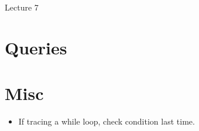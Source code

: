 \documentclass[12pt]{article}
\begin{document}
\begin{center}
   \LARGE Lecture 7
\end{center}

\section*{Queries}

\section*{Misc}

\begin{itemize}
   \item If tracing a while loop, check condition last time.
\end{itemize}
\end{document}

